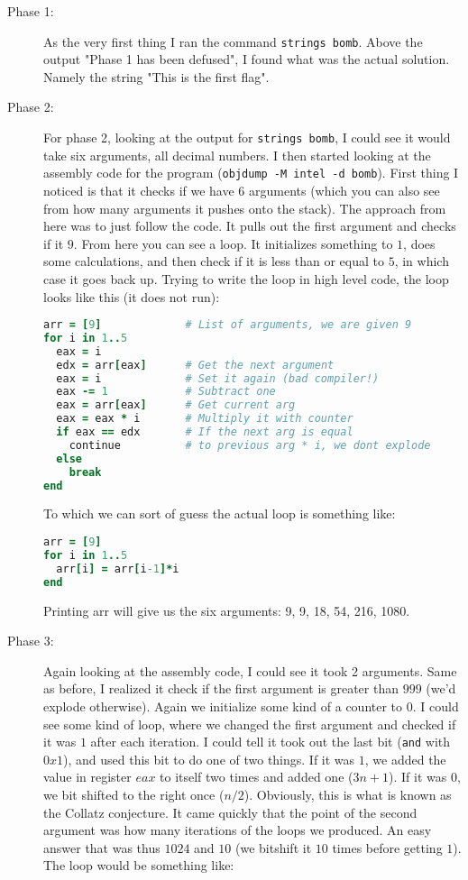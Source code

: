 \documentclass[a4paper]{article}
\begin{document}
\begin{description}
  \item[Phase 1:] As the very first thing I ran the command \texttt{strings bomb}. Above the output "Phase 1 has been defused", I found what was the actual solution. Namely the string "This is the first flag".
  \item[Phase 2:] For phase 2, looking at the output for \texttt{strings bomb}, I could see it would take six arguments, all decimal numbers. I then started looking at the assembly code for the program (\texttt{objdump -M intel -d bomb}). First thing I noticed is that it checks if we have 6 arguments (which you can also see from how many arguments it pushes onto the stack). The approach from here was to just follow the code. It pulls out the first argument and checks if it $9$. From here you can see a loop. It initializes something to $1$, does some calculations, and then check if it is less than or equal to $5$, in which case it goes back up. Trying to write the loop in high level code, the loop looks like this (it does not run):
\begin{lstlisting}[language=Ruby]
arr = [9]             # List of arguments, we are given 9
for i in 1..5
  eax = i
  edx = arr[eax]      # Get the next argument
  eax = i             # Set it again (bad compiler!)
  eax -= 1            # Subtract one
  eax = arr[eax]      # Get current arg
  eax = eax * i       # Multiply it with counter
  if eax == edx       # If the next arg is equal
    continue          # to previous arg * i, we dont explode
  else
    break
end
\end{lstlisting}
To which we can sort of guess the actual loop is something like:
\begin{lstlisting}[language=Ruby]
arr = [9]
for i in 1..5
  arr[i] = arr[i-1]*i
end
\end{lstlisting}
Printing arr will give us the six arguments: 9, 9, 18, 54, 216, 1080.
  \item[Phase 3:] Again looking at the assembly code, I could see it took 2 arguments. Same as before, I realized it check if the first argument is greater than $999$ (we'd explode otherwise). Again we initialize some kind of a counter to $0$. I could see some kind of loop, where we changed the first argument and checked if it was $1$ after each iteration. I could tell it took out the last bit (\texttt{and} with $0x1$), and used this bit to do one of two things. If it was $1$, we added the value in register $eax$ to itself two times and added one ($3n+1$). If it was $0$, we bit shifted to the right once ($n/2$). Obviously, this is what is known as the Collatz conjecture. It came quickly that the point of the second argument was how many iterations of the loops we produced. An easy answer that was thus $1024$ and $10$ (we bitshift it $10$ times before getting $1$). The loop would be something like:

\end{description}
\end{document}
